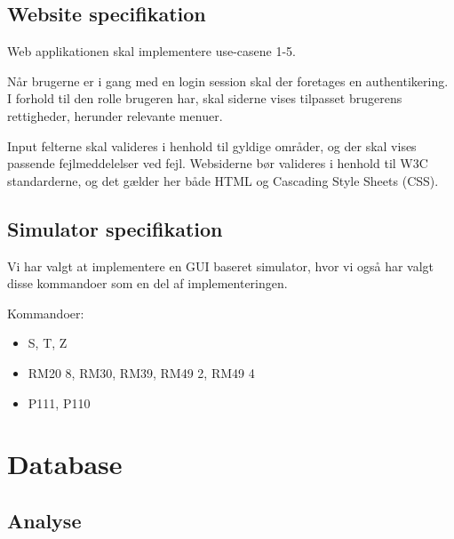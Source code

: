 \documentclass[a4paper]{article}
\begin{document}
\subsection{Website specifikation} %

Web applikationen skal implementere use-casene 1-5.

Når brugerne er i gang med en login session skal der foretages en authentikering. I forhold til den rolle brugeren har, skal siderne vises tilpasset brugerens rettigheder, herunder relevante menuer.

Input felterne skal valideres i henhold til gyldige områder, og der skal vises passende fejlmeddelelser ved fejl. Websiderne bør valideres i henhold til W3C standarderne, og det gælder her både HTML og Cascading Style Sheets (CSS).


\subsection{Simulator specifikation} %

Vi har valgt at implementere en GUI baseret simulator, hvor vi også har valgt disse kommandoer som en del af implementeringen.

Kommandoer:

\begin{itemize}
  \item S, T, Z
  \item RM20 8, RM30, RM39, RM49 2, RM49 4
  \item P111, P110
\end{itemize}



\section{Database} %

\subsection{Analyse} %
\end{document}
